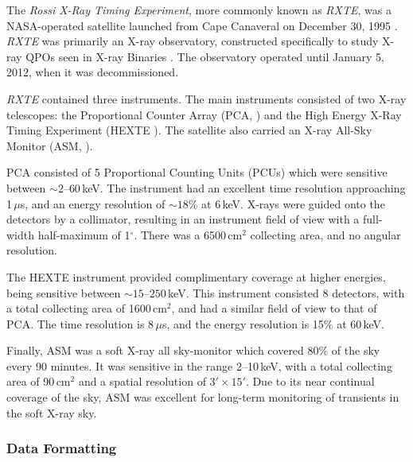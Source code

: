 \par The \textit{Rossi X-Ray Timing Experiment}, more commonly known as \textit{RXTE}, was a NASA-operated satellite launched from Cape Canaveral on December 30, 1995 \citep{Bradt_RXTE}.  \textit{RXTE} was primarily an X-ray observatory, constructed specifically to study X-ray QPOs seen in X-ray Binaries \citep{Bradt_XTEaims}.  The observatory operated until January 5, 2012, when it was decommissioned.
\par \textit{RXTE} contained three instruments.  The main instruments consisted of two X-ray telescopes: the Proportional Counter Array (PCA, \citealp{Jahoda_PCA}) and the High Energy X-Ray Timing Experiment (HEXTE \citealp{Gruber_HEXTE}).  The satellite also carried an X-ray All-Sky Monitor (ASM, \citealp{Levine_ASM}).
\par PCA consisted of 5 Proportional Counting Units (PCUs) which were sensitive between $\sim2$--$60$\,keV.  The instrument had an excellent time resolution approaching 1\,$\mu$s, and an energy resolution of $\sim18\%$ at 6\,keV.  X-rays were guided onto the detectors by a collimator, resulting in an instrument field of view with a full-width half-maximum of 1$^\circ$.  There was a 6500\,cm$^2$ collecting area, and no angular resolution.
\par The HEXTE instrument provided complimentary coverage at higher energies, being sensitive between $\sim15$--$250$\,keV.  This instrument consisted 8 detectors, with a total collecting area of 1600\,cm$^2$, and had a similar field of view to that of PCA.  The time resolution is 8\,$\mu$s, and the energy resolution is 15\% at 60\,keV.
\par Finally, ASM was a soft X-ray all sky-monitor which covered 80\% of the sky every 90 minutes.  It was sensitive in the range 2--10\,keV, with a total collecting area of 90\,cm$^2$ and a spatial resolution of $3'\times15'$.  Due to its near continual coverage of the sky, ASM was excellent for long-term monitoring of transients in the soft X-ray sky.

\subsubsection{Data Formatting}

